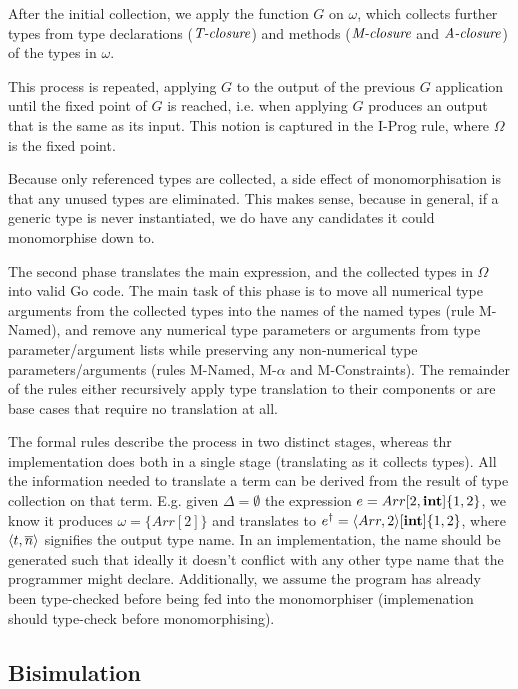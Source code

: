 After the initial collection, we apply the function $G$ on $\omega$, which
collects further types from type declarations ($\textit{T-closure}$) and methods
($\textit{M-closure}$ and $\textit{A-closure}$) of the types in $\omega$.

This process is repeated, applying $G$ to the output of the previous $G$
application until the fixed point of $G$ is reached, i.e. when applying $G$
produces an output that is the same as its input. This notion is captured in the
I-Prog rule, where $\Omega$ is the fixed point.

Because only referenced types are collected, a side effect of monomorphisation
is that any unused types are eliminated. This makes sense, because in general,
if a generic type is never instantiated, we do have any candidates it could
monomorphise down to.

The second phase translates the main expression, and the collected types in
$\Omega$ into valid Go code. The main task of this phase is to move all
numerical type arguments from the collected types into the names of the named
types (rule M-Named), and remove any numerical type parameters or arguments from
type parameter/argument lists while preserving any non-numerical type
parameters/arguments (rules M-Named, M-$\alpha$ and M-Constraints). The
remainder of the rules either recursively apply type translation to their
components or are base cases that require no translation at all.

The formal rules describe the process in two distinct stages, whereas thr
implementation does both in a single stage (translating as it collects types).
All the information needed to translate a term can be derived from the result of
type collection on that term. E.g. given $\Delta = \emptyset$ the expression $e
    = Arr[2, \texttt{\bf int}]\{1, 2\}$, we know it produces $\omega = \{Arr[2]\}$ and
translates to $e^\dagger = \langle Arr, 2 \rangle[\texttt{\bf int}]\{1, 2\}$, where $\langle t,
        \overline{n} \rangle$ signifies the output type name. In an implementation, the name should
be generated such that ideally it doesn't conflict with any other type name that
the programmer might declare. Additionally, we assume the program has already
been type-checked before being fed into the monomorphiser (implemenation should
type-check before monomorphising).



\subsection{Bisimulation}

